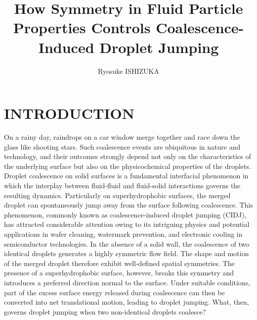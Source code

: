 \documentclass[journal=jacsat,manuscript=article]{achemso}
\author{Ryosuke ISHIZUKA}
\affiliation[ZKA]
{Zkanics F.P.S., SIDE-6 Senriyama-West, Suita, Osaka 565-0851, Japan}
\title[\texttt{achemso} demonstration]
{How Symmetry in Fluid Particle Properties Controls Coalescence-Induced Droplet Jumping}
\begin{document}
\begin{abstract}

\end{abstract}


\clearpage
\section{INTRODUCTION}
On a rainy day, raindrops on a car window merge together and race down the glass like shooting stars.
Such coalescence events are ubiquitous in nature and technology, and their outcomes
strongly depend not only on the characteristics of the underlying surface
but also on the physicochemical properties of the droplets.
Droplet coalescence on solid surfaces is a fundamental interfacial phenomenon in which the interplay
between fluid-fluid and fluid-solid interactions governs the resulting dynamics.
Particularly on superhydrophobic surfaces, the merged droplet can spontaneously
jump away from the surface following coalescence.
This phenomenon, commonly known as coalescence-induced droplet jumping (CIDJ),
has attracted considerable attention owing to its intriguing physics and potential
applications in wafer cleaning, watermark prevention, and electronic cooling
in semiconductor technologies.
In the absence of a solid wall, the coalescence of two identical droplets
generates a highly symmetric flow field.
The shape and motion of the merged droplet therefore exhibit
well-defined spatial symmetries.
The presence of a superhydrophobic surface, however, breaks this symmetry and
introduces a preferred direction normal to the surface.
Under suitable conditions, part of the excess surface energy released during coalescence
can then be converted into net translational motion, leading to droplet jumping.
What, then, governs droplet jumping when two non-identical droplets coalesce?
\end{document}
